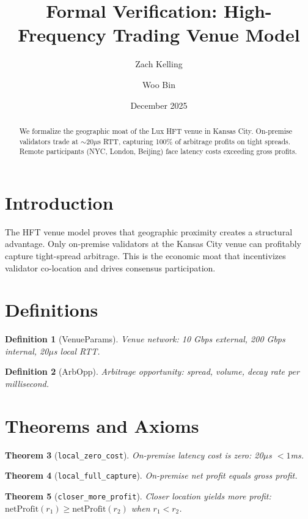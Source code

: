 \documentclass[11pt]{article}
\title{Formal Verification: High-Frequency Trading Venue Model}
\author{Zach Kelling \and Woo Bin}
\date{December 2025}
\newtheorem{theorem}{Theorem}
\newtheorem{definition}[theorem]{Definition}
\begin{document}
\maketitle

\begin{abstract}
We formalize the geographic moat of the Lux HFT venue in Kansas City. On-premise validators trade at $\sim$20$\mu$s RTT, capturing 100\% of arbitrage profits on tight spreads. Remote participants (NYC, London, Beijing) face latency costs exceeding gross profits.
\end{abstract}

\section{Introduction}
The HFT venue model proves that geographic proximity creates a structural advantage. Only on-premise validators at the Kansas City venue can profitably capture tight-spread arbitrage. This is the economic moat that incentivizes validator co-location and drives consensus participation.

\section{Definitions}
\begin{definition}[VenueParams]
Venue network: 10 Gbps external, 200 Gbps internal, 20$\mu$s local RTT.
\end{definition}

\begin{definition}[ArbOpp]
Arbitrage opportunity: spread, volume, decay rate per millisecond.
\end{definition}


\section{Theorems and Axioms}
\begin{theorem}[\texttt{local\_zero\_cost}]
On-premise latency cost is zero: 20$\mu$s $< 1$ms.
\end{theorem}

\begin{theorem}[\texttt{local\_full\_capture}]
On-premise net profit equals gross profit.
\end{theorem}

\begin{theorem}[\texttt{closer\_more\_profit}]
Closer location yields more profit: $\text{netProfit}(r_1) \geq \text{netProfit}(r_2)$ when $r_1 < r_2$.
\end{theorem}
\end{document}
